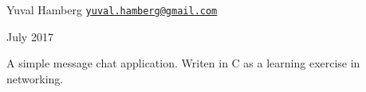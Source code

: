 Yuval Hamberg \href{mailto:yuval.hamberg@gmail.com}{\tt yuval.\+hamberg@gmail.\+com}

July 2017

A simple message chat application. Writen in C as a learning exercise in networking. 